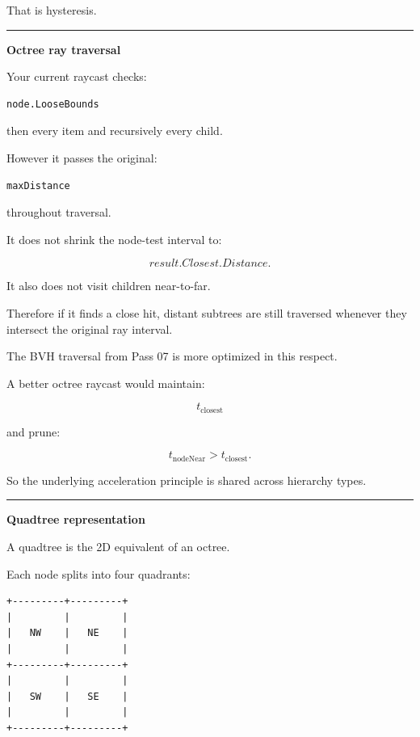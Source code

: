 That is hysteresis.

\begin{center}\rule{0.5\linewidth}{0.5pt}\end{center}

\textbf{Octree ray traversal}

Your current raycast checks:

\begin{verbatim}
node.LooseBounds
\end{verbatim}

then every item and recursively every child.

However it passes the original:

\begin{verbatim}
maxDistance
\end{verbatim}

throughout traversal.

It does not shrink the node-test interval to:

\[
result.Closest.Distance.
\]

It also does not visit children near-to-far.

Therefore if it finds a close hit, distant subtrees are still traversed whenever they intersect the original ray interval.

The BVH traversal from Pass 07 is more optimized in this respect.

A better octree raycast would maintain:

\[
t_{\text{closest}}
\]

and prune:

\[
t_{\text{nodeNear}}>
t_{\text{closest}}.
\]

So the underlying acceleration principle is shared across hierarchy types.

\begin{center}\rule{0.5\linewidth}{0.5pt}\end{center}

\textbf{Quadtree representation}

A quadtree is the 2D equivalent of an octree.

Each node splits into four quadrants:

\begin{verbatim}
+---------+---------+
|         |         |
|   NW    |   NE    |
|         |         |
+---------+---------+
|         |         |
|   SW    |   SE    |
|         |         |
+---------+---------+
\end{verbatim}

